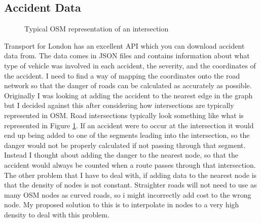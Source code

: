 \documentclass[11pt,twoside,a4paper]{article}
\begin{document}
\subsection{Accident Data}
\begin{figure}
    \begin{center}
\end{center}
    \caption{Typical OSM representation of an intersection}
    \label{intersection}
\end{figure}
Transport for London has an excellent API which you can download accident data from. The data comes in JSON files and contains information about what type of vehicle was involved in each accident, the severity, and the coordinates of the accident. 
I need to find a way of mapping the coordinates onto the road network so that the danger of roads can be calculated as accurately as possible. Originally I was looking at adding the accident to the nearest edge in the graph but I decided against this after considering how intersections 
are typically represented in OSM. Road intersections typically look something like what is represented in Figure \ref{intersection}. If an accident were to occur at the intersection it would end up being added to one of the segments leading into the intersection, so the danger would not be properly calculated if not passing through that segment. Instead I thought about adding the danger to the nearest node, so that the accident would always be counted when a route passes through that intersection.
The other problem that I have to deal with, if adding data to the nearest node is that the density of nodes is not constant. Straighter roads will not need to use as many OSM nodes as curved roads, so i might incorrectly add cost to the wrong node. My proposed solution to this is to interpolate in nodes to a very high density to deal with this problem.
\end{document}
